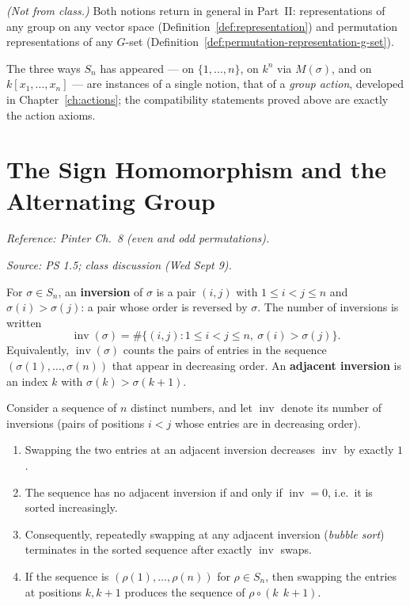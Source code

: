 \documentclass[11pt]{report}
\begin{document}
\textit{(Not from class.)} Both notions return in general in Part~II: representations of any group on any vector space (Definition~\ref{def:representation}) and permutation representations of any $G$-set (Definition~\ref{def:permutation-representation-g-set}).

\begin{rembox}\label{rem:group-actions}
The three ways $S_n$ has appeared --- on $\{1, \ldots, n\}$, on $k^n$ via $M(\sigma)$, and on $k[x_1, \ldots, x_n]$ --- are instances of a single notion, that of a \emph{group action}, developed in Chapter~\ref{ch:actions}; the compatibility statements proved above are exactly the action axioms.
\end{rembox}

\section{The Sign Homomorphism and the Alternating Group}\label{sec:sign}

\textit{Reference: Pinter Ch.\ 8 (even and odd permutations).}

\textit{Source: PS 1.5; class discussion (Wed Sept 9).}

\begin{defbox}\label{def:inversions-permutation}
For $\sigma \in S_n$, an \textbf{inversion} of $\sigma$ is a pair $(i, j)$ with $1 \leq i < j \leq n$ and $\sigma(i) > \sigma(j)$: a pair whose order is reversed by $\sigma$. The number of inversions is written
\[ \operatorname{inv}(\sigma) = \#\{(i, j) : 1 \leq i < j \leq n,\ \sigma(i) > \sigma(j)\}. \]
Equivalently, $\operatorname{inv}(\sigma)$ counts the pairs of entries in the sequence $(\sigma(1), \ldots, \sigma(n))$ that appear in decreasing order. An \textbf{adjacent inversion} is an index $k$ with $\sigma(k) > \sigma(k+1)$.
\end{defbox}

\begin{lembox}\label{lem:sorting-adjacent-swaps}
Consider a sequence of $n$ distinct numbers, and let $\operatorname{inv}$ denote its number of inversions (pairs of positions $i < j$ whose entries are in decreasing order).
\begin{enumerate}
    \item Swapping the two entries at an adjacent inversion decreases $\operatorname{inv}$ by exactly $1$.
    \item The sequence has no adjacent inversion if and only if $\operatorname{inv} = 0$, i.e.\ it is sorted increasingly.
    \item Consequently, repeatedly swapping at any adjacent inversion (\emph{bubble sort}) terminates in the sorted sequence after exactly $\operatorname{inv}$ swaps.
    \item If the sequence is $(\rho(1), \ldots, \rho(n))$ for $\rho \in S_n$, then swapping the entries at positions $k, k+1$ produces the sequence of $\rho \circ (k\ \ k{+}1)$.
\end{enumerate}
\end{lembox}
\end{document}
